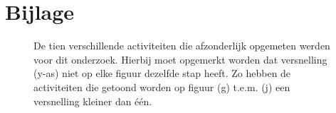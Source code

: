 \documentclass{article}
\begin{document}



\newpage
\onecolumn

\section{Bijlage}

\begin{figure}[h!]
\centering

\caption{De tien verschillende activiteiten die afzonderlijk opgemeten werden voor dit onderzoek. Hierbij moet opgemerkt worden dat versnelling (y-as) niet op elke figuur dezelfde stap heeft. Zo hebben de activiteiten die getoond worden op figuur (g) t.e.m. (j) een versnelling kleiner dan \'e\'en.}


\end{figure}
\end{document}
